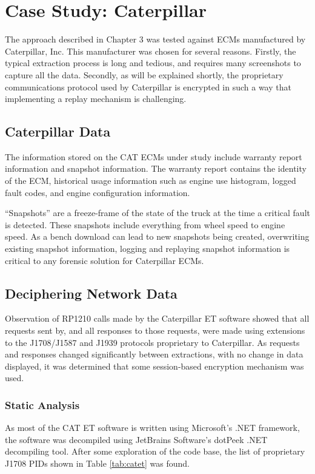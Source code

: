 \chapter{Case Study: Caterpillar}

The approach described in Chapter 3 was tested against ECMs manufactured by Caterpillar, Inc. This manufacturer was
chosen for several reasons. Firstly, the typical extraction process is long and tedious, and requires many screenshots to capture all the data. 
Secondly, as will be explained shortly, the proprietary communications protocol used
by Caterpillar is encrypted in such a way that implementing a replay mechanism is challenging.

\section{Caterpillar Data}

The information stored on the CAT ECMs under study include warranty report information and snapshot
information. The warranty report contains the identity of the ECM, historical usage information such as engine use histogram,
logged fault codes, and engine configuration information.

``Snapshots'' are a freeze-frame of the state of the truck at the time a critical fault is detected. These snapshots
include everything from wheel speed to engine speed. As a bench download can lead to new snapshots being created, overwriting
existing snapshot information, logging and replaying snapshot information is critical to any forensic solution for
Caterpillar ECMs.

\section{Deciphering Network Data}

Observation of RP1210 calls made by the Caterpillar ET software showed that all requests sent by,
and all responses to those requests, were made using extensions to the J1708/J1587 and J1939 protocols
proprietary to Caterpillar. As requests and responses changed significantly between extractions, with
no change in data displayed, it was determined that some session-based encryption mechanism was
used.

\subsection{Static Analysis}

As most of the CAT ET software is written using Microsoft's .NET framework, the software was decompiled
using JetBrains Software's dotPeek .NET decompiling tool. After some exploration of the code base,
the list of proprietary J1708 PIDs shown in Table \ref{tab:catet} was found.

